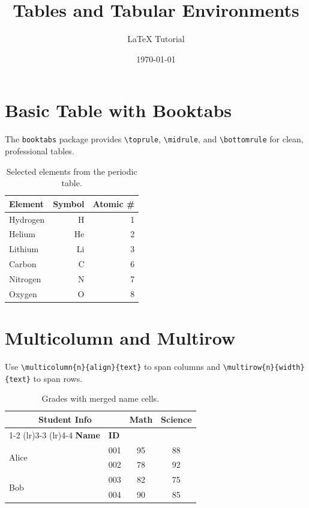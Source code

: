 \documentclass[12pt]{article}
\title{Tables and Tabular Environments}
\author{LaTeX Tutorial}
\date{\today}
\begin{document}
\maketitle

\section{Basic Table with Booktabs}

The \texttt{booktabs} package provides \verb|\toprule|, \verb|\midrule|,
and \verb|\bottomrule| for clean, professional tables.

\begin{table}[ht]
\centering
\begin{tabular}{lrr}
    \toprule
    \textbf{Element} & \textbf{Symbol} & \textbf{Atomic \#} \\
    \midrule
    Hydrogen  & H  & 1  \\
    Helium    & He & 2  \\
    Lithium   & Li & 3  \\
    Carbon    & C  & 6  \\
    Nitrogen  & N  & 7  \\
    Oxygen    & O  & 8  \\
    \bottomrule
\end{tabular}
\caption{Selected elements from the periodic table.}
\label{tab:elements}
\end{table}

\section{Multicolumn and Multirow}

Use \verb|\multicolumn{n}{align}{text}| to span columns
and \verb|\multirow{n}{width}{text}| to span rows.

\begin{table}[ht]
\centering
\begin{tabular}{llcc}
    \toprule
    \multicolumn{2}{c}{\textbf{Student Info}} & \textbf{Math} & \textbf{Science} \\
    \cmidrule(lr){1-2} \cmidrule(lr){3-3} \cmidrule(lr){4-4}
    \textbf{Name} & \textbf{ID} & & \\
    \midrule
    \multirow{2}{*}{Alice}  & 001 & 95 & 88 \\
                             & 002 & 78 & 92 \\
    \midrule
    \multirow{2}{*}{Bob}    & 003 & 82 & 75 \\
                             & 004 & 90 & 85 \\
    \bottomrule
\end{tabular}
\caption{Grades with merged name cells.}
\label{tab:grades}
\end{table}
\end{document}

